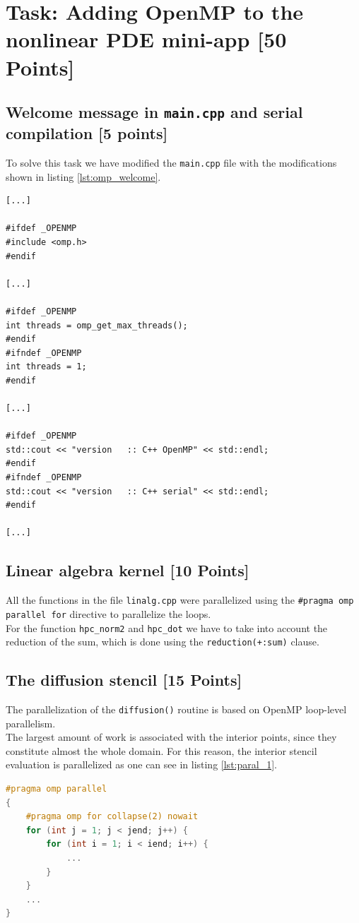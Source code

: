 \documentclass[unicode,10pt,a4paper,oneside,numbers=endperiod,openany]{scrartcl}
\begin{document}
\newpage
\section{Task: Adding OpenMP to the nonlinear PDE mini-app [50 Points]}
\subsection{Welcome message in \texttt{main.cpp} and serial compilation [5 points]}
To solve this task we have modified the \texttt{main.cpp} file with the modifications shown in listing \ref{lst:omp_welcome}.
\begin{lstlisting}[style=grayverbatim, label={lst:omp_welcome}, caption={Modifications to the welcome message in \texttt{main.cpp} to support OpenMP}]
[...]

#ifdef _OPENMP
#include <omp.h>
#endif

[...]

#ifdef _OPENMP
int threads = omp_get_max_threads(); 
#endif
#ifndef _OPENMP
int threads = 1;
#endif

[...]

#ifdef _OPENMP
std::cout << "version   :: C++ OpenMP" << std::endl;
#endif
#ifndef _OPENMP
std::cout << "version   :: C++ serial" << std::endl;
#endif

[...]
\end{lstlisting}
\subsection{Linear algebra kernel [10 Points]}
All the functions in the file \texttt{linalg.cpp} were parallelized using the \texttt{\#pragma omp parallel for} directive to parallelize the loops.\\
For the function \texttt{hpc\_norm2} and \texttt{hpc\_dot} we have to take into account the reduction of the sum, which is done using the \texttt{reduction(+:sum)} clause.\\
\subsection{The diffusion stencil [15 Points]}
The parallelization of the \texttt{diffusion()} routine is based on OpenMP loop-level parallelism.\\  
The largest amount of work is associated with the interior points, since they constitute almost the whole domain.  
For this reason, the interior stencil evaluation is parallelized as one can see in listing \ref{lst:paral_1}.
\begin{lstlisting}[language=C++,style=grayverbatim,label=lst:paral_1,caption=Interior grid points parallelization]
#pragma omp parallel
{
    #pragma omp for collapse(2) nowait
    for (int j = 1; j < jend; j++) {
        for (int i = 1; i < iend; i++) {
            ...
        }
    }
    ...
}
\end{lstlisting}
\end{document}
